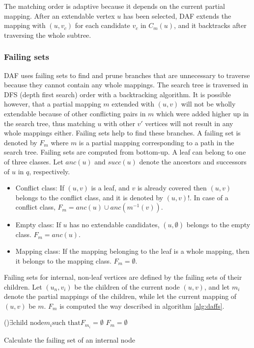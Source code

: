 The matching order is adaptive because it depends on the current partial mapping. After an extendable vertex $u$
has been selected, DAF extends the mapping with $(u, v_c)$ for each candidate $v_c$ in $C_m(u)$, and it backtracks
after traversing the whole subtree.

\subsubsection{Failing sets}

DAF uses failing sets to find and prune branches that are unnecessary to traverse because they cannot contain any
whole mappings. The search tree is traversed in DFS (depth first search) order with a backtracking algorithm. It
is possible however, that a partial mapping $m$ extended with $(u, v)$ will not be wholly extendable because of
other conflicting pairs in $m$ which were added higher up in the search tree, thus matching $u$ with other $v'$
vertices will not result in any whole mappings either. Failing sets help to find these branches. A failing set is
denoted by $F_m$ where $m$ is a partial mapping corresponding to a path in the search tree. Failing sets are computed
from bottom-up. A leaf can belong to one of three classes. Let $anc(u)$ and $succ(u)$ denote the ancestors and 
successors of $u$ in $q$, respectively.

\begin{itemize}
    \item Conflict class: If $(u, v)$ is a leaf, and $v$ is already covered then $(u, v)$ belongs to the conflict class, and it is denoted by $(u, v)!$. In case of a conflict class, $F_m = anc(u) \cup anc(m^{-1}(v))$.
    \item Empty class: If $u$ has no extendable candidates, $(u, \emptyset)$ belongs to the empty class. $F_m = anc(u)$.
    \item Mapping class: If the mapping belonging to the leaf is a whole mapping, then it belongs to the mapping class. $F_m = \emptyset$.
\end{itemize}

Failing sets for internal, non-leaf vertices are defined by the failing sets of their children. Let $(u_n, v_i)$ be the 
children of the current node $(u, v)$, and let $m_i$ denote the partial mappings of the children, while let the current 
mapping of $(u, v)$ be $m$. $F_m$ is computed the way described in algorithm \ref{alg:daffs}.

\begin{algorithm}[h]
    \SetAlgoLined\DontPrintSemicolon    
    \uIf(){$\exists \text{child node} m_i \text{such that} F_{m_i} = \emptyset$}{
        \nl $F_m = \emptyset$\;
    }
    \label{alg:daffs}
    \caption{Calculate the failing set of an internal node}
\end{algorithm}

